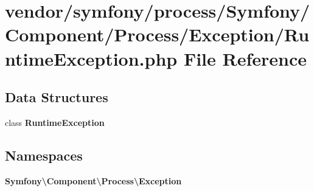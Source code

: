 \section{vendor/symfony/process/\+Symfony/\+Component/\+Process/\+Exception/\+Runtime\+Exception.php File Reference}
\label{symfony_2process_2_symfony_2_component_2_process_2_exception_2_runtime_exception_8php}
\subsection*{Data Structures}
\begin{DoxyCompactItemize}
\item 
class {\bf Runtime\+Exception}
\end{DoxyCompactItemize}
\subsection*{Namespaces}
\begin{DoxyCompactItemize}
\item 
 {\bf Symfony\textbackslash{}\+Component\textbackslash{}\+Process\textbackslash{}\+Exception}
\end{DoxyCompactItemize}
